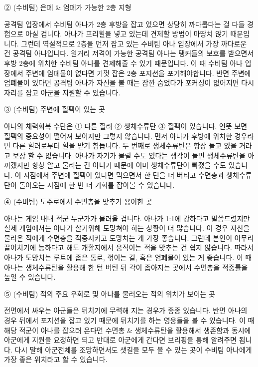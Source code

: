  

② (수비팀) 은폐 & 엄폐가 가능한 2층 지형

공격팀 입장에서 수비팀 아나가 2층 후방을 잡고 있으면 상당히 까다롭다는 걸 다들 경험으로 아실 겁니다. 아나가 프리힐을 넣고 있는데 견제할 방법이 마땅치 않기 때문입니다. 그런데 역설적으로 2층을 먼저 잡고 있는 수비팀 아나 입장에서 가장 까다로운 건 공격팀 아나입니다. 원거리 저격이 가능한 공격팀 아나는 탱커들의 보호를 받으면서 후방 2층에 위치한 수비팀 아나를 견제해줄 수 있기 때문입니다. 이 때 수비팀 아나 입장에서 주변에 엄폐물이 없다면 기껏 잡은 2층 포지션을 포기해야합니다. 반면 주변에 엄폐물이 있다면 공격팀 아나가 자신을 볼 때는 잠깐 숨었다가 포커싱이 없어지면 다시 자리를 잡고 아군을 지원할 수 있습니다.

 

③ (수비팀) 주변에 힐팩이 있는 곳

아나의 체력회복 수단은 ① 다른 힐러 ② 생체수류탄 ③ 힐팩이 있습니다. 언뜻 보면 힐팩의 중요성이 떨어져 보이지만 그렇지 않습니다. 먼저 아나가 후방에 위치한 경우라면 다른 힐러로부터 힐을 받기 힘듭니다. 두 번째로 생체수류탄은 항상 들고 있을 거라고 보장 할 수 없습니다. 아나가 자기가 물릴 수도 있다는 생각이 들면 생체수류탄을 아끼겠지만 항상 알고 물리는 건 아니기 때문에 이미 생체수류탄이 빠졌을 수도 있습니다. 이 시점에서 주변에 힐팩이 있다면 먹으면서 한 턴을 더 버티고 수면총과 생체수류탄이 돌아오는 시점에 한 번 더 기회를 잡아볼 수 있습니다.

 

④ (수비팀) 도주로에서 수면총을 맞추기 용이한 곳

아나는 게임 내내 적군 누군가가 물러올 겁니다. 아나가 1:1에 강하다고 말씀드렸지만 실제 게임에서는 아나가 살기위해 도망쳐야 하는 상황이 더 많습니다. 이 경우 자신을 물러온 적에게 수면총을 적중시키고 도망치는 게 가장 좋습니다. 그런데 본인이 아무리 끌어치기에 능하다고 해도 개활지에서 움직이는 적을 맞추는 건 쉽지 않습니다. 따라서 아나가 도망치는 루트에 좁은 통로, 꺾이는 길, 혹은 엄폐물이 있는 게 좋습니다. 이 때 아나는 생체수류탄을 활용해 한 턴 버틴 뒤 각이 좁아지는 곳에서 수면총을 적중률을 높일 수 있습니다.

 

⑤ (수비팀) 적의 주요 우회로 및 아나를 물러오는 적의 위치가 보이는 곳

전면에서 싸우는 아군들은 뒤치기에 무력해 지는 경우가 종종 있습니다. 반면 아나의 경우 뒤에서 포지션을 잡고 있기 때문에 뒤치기를 하는 영웅들을 볼 수 있습니다. 이 때 해당 적군이 아나를 잡으러 온다면 수면총 & 생체수류탄을 활용해서 생존함과 동시에 아군에게 지원을 요청하면 되고 반대로 아군에게 간다면 브리핑을 통해 알려주면 됩니다. 다시 말해 아군전체를 조망하면서도 샛길을 모두 볼 수 있는 곳이 수비팀 아나에게 가장 좋은 위치라고 할 수 있습니다.

